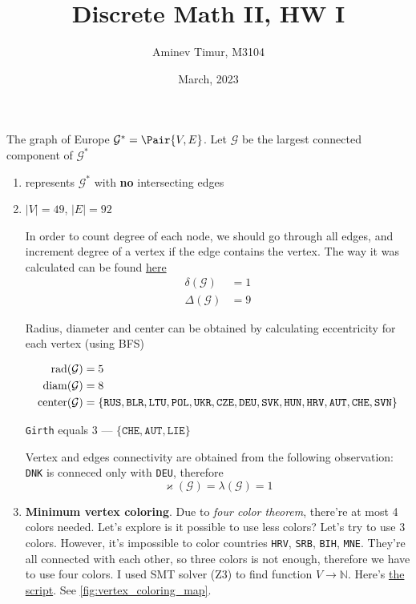 \documentclass[12pt, a4paper]{article}
\title{Discrete Math II, HW I}
\date{March, 2023}
\author{Aminev Timur, M3104}
\newcommand\EGraph{\mathcal{G}^{*}}
\newcommand\EGraphL{\mathcal{G}}
\begin{document}
\maketitle

\problem The graph of Europe \(\EGraph = \Pair{V, E}\). Let \(\EGraphL\) be the
largest connected component of \(\EGraph\)

\begin{enumerate}[label=\alph*)]
\item {} represents \(\EGraph\) with \textbf{no} intersecting
edges
\item \(|V| = 49\), \(|E| = 92\)

In order to count degree of each node, we should go through all edges, and
increment degree of a vertex if the edge contains the vertex.
The way it was calculated can be found
\href{https://github.com/ablearthy-itmo-39828cf299f04949c86/discrete-math-2-hw-1/blob/c665370/auto/general.py}{here}
\begin{align*}
\delta(\EGraphL) &= 1 \\
\Delta(\EGraphL) &= 9
\end{align*}

Radius, diameter and center can be obtained by calculating eccentricity for
each vertex (using BFS)

\begin{align*}
\rad(\EGraphL) &= 5 \\
\diam(\EGraphL) &= 8 \\
\mycenter(\EGraphL) &= \{\texttt{RUS}, \texttt{BLR}, \texttt{LTU}, \texttt{POL}, \texttt{UKR}, \texttt{CZE}, \texttt{DEU}, \texttt{SVK}, \texttt{HUN}, \texttt{HRV}, \texttt{AUT}, \texttt{CHE}, \texttt{SVN}\}
\end{align*}

\texttt{Girth} equals 3 --- \(\{\texttt{CHE}, \texttt{AUT}, \texttt{LIE}\}\)

Vertex and edges connectivity are obtained from the following observation:
\texttt{DNK} is conneced only with \texttt{DEU}, therefore
\[\varkappa(\EGraphL) = \lambda(\EGraphL) = 1\]

\item \textbf{Minimum vertex coloring}. Due to \textit{four color theorem},
there're at most 4 colors needed. Let's explore is it possible to use less
colors? Let's try to use 3 colors. However, it's impossible to color countries
\texttt{HRV}, \texttt{SRB}, \texttt{BIH}, \texttt{MNE}. They're all connected
with each other, so three colors is not enough, therefore we have to use four
colors. I used SMT solver (Z3) to find function \(V \to \mathbb{N}\). Here's
\href{https://github.com/ablearthy-itmo-39828cf299f04949c86/discrete-math-2-hw-1/blob/753891b/auto/vertex_coloring.py}{the
script}. See \cref{fig:vertex_coloring_map}.


\end{enumerate}
\end{document}
